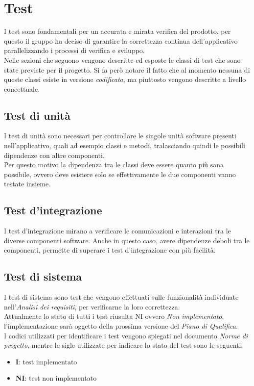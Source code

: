 \section{Test}
I test sono fondamentali per un accurata e mirata verifica del prodotto, per questo il gruppo ha deciso di garantire la correttezza continua dell'applicativo parallelizzando i processi di verifica e sviluppo.\\
Nelle sezioni che seguono vengono descritte ed esposte le classi di test che sono state previste per il progetto. Si fa però notare il fatto che al momento nessuna di queste classi esiste in versione \textit{codificata}, ma piuttosto vengono descritte a livello concettuale.

\subsection{Test di unità}
I test di unità sono necessari per controllare le singole unità software presenti nell'applicativo, quali ad esempio classi e metodi, tralasciando quindi le possibili dipendenze con altre componenti.\\
Per questo motivo la dipendenza tra le classi deve essere quanto più sana possibile, ovvero deve esistere solo se effettivamente le due componenti vanno testate insieme.

\subsection{Test d'integrazione}
I test d'integrazione mirano a verificare le comunicazioni e interazioni tra le diverse componenti software. Anche in questo caso, avere dipendenze deboli tra le componenti, permette di superare i test d'integrazione con più facilità.

\subsection{Test di sistema}
I test di sistema sono test che vengono effettuati sulle funzionalità individuate nell'\textit{Analisi dei requisiti}, per verificarne la loro correttezza. \\
Attualmente lo stato di tutti i test riusulta NI ovvero \textit{Non implementato}, l'implementazione sarà oggetto della prossima versione del \textit{Piano di Qualifica}.\\
I codici utilizzati per identificare i test vengono spiegati nel documento \textit{Norme di progetto}, mentre le sigle utilizzate per indicare lo stato del test sono le seguenti: 
\begin{itemize}
    \item \textbf{I}: test implementato
    \item \textbf{NI}: test non implementato
\end{itemize}


